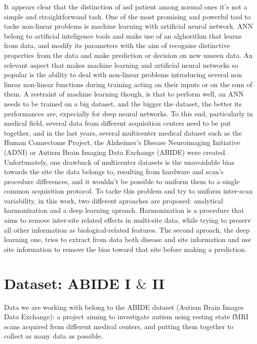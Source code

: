 \documentclass[a4paper,11pt]{article}
\begin{document}
It appears clear that the distinction of asd patient among normal ones it's not a simple and straightforwand task.
One of the most promising and powerful tool to tacke non-linear problems is machine learning with artificial neural network.
ANN belong to artificial inteligence tools and make use of an alghorithm that learns from data, and modify its parameters with the aim of recognise distinctive properties from the data and make prediction or decision on new unseen data.
An relevant aspect that makes machine learning and artificial neural networks so popular is the ability to deal with non-linear problems introducing several non linear non-linear functions during training acting on their inputs or on the sum of them.
A restraint of machine learning though, is that to perform well, an ANN needs to be trained on a big dataset, and the bigger the dataset, the better its performances are, expecially for deep neural networks.
To this end, particularly in medical field, several data from different acquisition centers need to be put together, and in the last years, several multicenter medical dataset such as the Human Connectome Project, the Alzheimer’s Disease Neuroimaging Initiative (ADNI) or Autism Brain Imaging Data Exchange (ABIDE) were created.
Unfortunately, one drawback of multicenter datasets is the unavoidable bias towards the site the data belongs to, resulting from hardware and scan's procedure differences, and it wouldn't be possible to uniform them to a single common acquisition protocol.
To tacke this problem and try to uniform inter-scan variability, in this work, two different aproaches are proposed: analytical harmonization and a deep learning aproach.
Harmonization is a procedure that aims to remove inter-site related effects in multi-site data, while trying to preserv all other information as biological-related features.
The second aproach, the deep learning one, tries to extract from data both disease and site information and use site information to remove the bias toward that site before making a prediction.

\section{Dataset: ABIDE I $\&$ II}


Data we are working with belong to the ABIDE dataset (Autism Brain Images Data Exchange): a project aiming to investigate autism using resting state fMRI scans acquired from different medical centers, and putting them together to collect as many data as possible.
\end{document}
